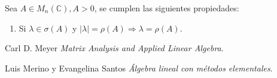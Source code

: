 \documentclass[size=a4, parskip=half, titlepage=false, toc=flat, toc=bib, 12pt]{scrartcl}
\theoremstyle{theorem-style}
\theoremstyle{definition-style}
\theoremstyle{remark-style}
\theoremstyle{example-style}
\theoremstyle{definition-style}
\theoremstyle{remark-style}
\begin{document}
Sea $A \in M_n(\mathbb{C}), A > 0$, se cumplen las siguientes propiedades:
\begin{enumerate}
\item Si $\lambda \in \sigma(A)$ y $|\lambda| = \rho(A) \Rightarrow \lambda = \rho(A)$.
\end{enumerate}


\begin{thebibliography}{9}
Carl D. Meyer
\textit{Matrix Analysis and Applied Linear Algebra}.

Luis Merino y Evangelina Santos
\textit{Álgebra lineal con métodos elementales}.

\end{thebibliography}
\end{document}
